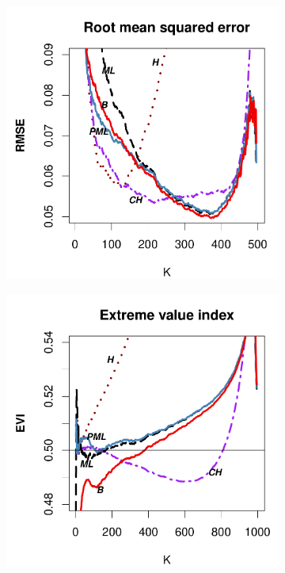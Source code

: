 \begin{figure}[h]
\begin{subfigure}[h]{0.40\linewidth}
		\end{subfigure}
		\hspace{\fill}
		\begin{subfigure}[h]{0.40\linewidth}
			\includegraphics[width=\textwidth]{./plots/paper1/RMSE_Outputfrehet0,5500.pdf}
		\end{subfigure}
		\bigskip
		\centering
		\begin{subfigure}[h]{0.40\linewidth}
			\includegraphics[width=\textwidth]{./plots/paper1/EVI_Outputfrehet0,51000.pdf}

\end{subfigure}
\end{figure}
